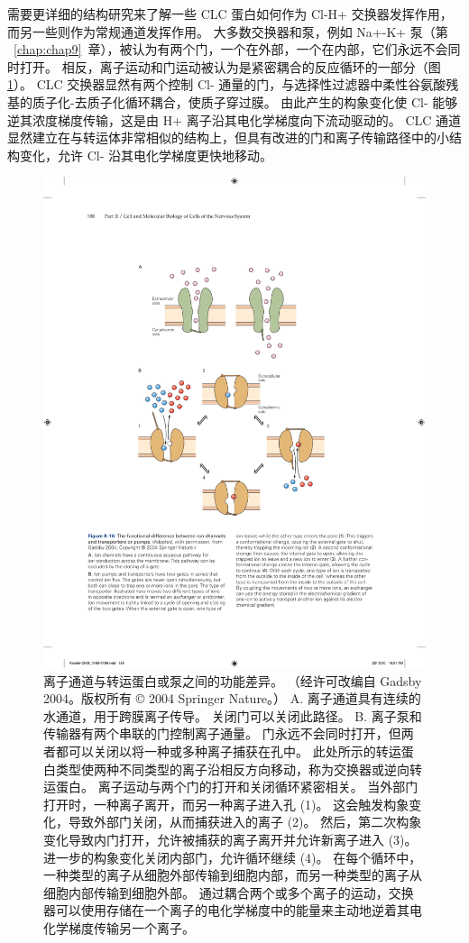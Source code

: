 需要更详细的结构研究来了解一些 CLC 蛋白如何作为 Cl-H+ 交换器发挥作用，而另一些则作为常规通道发挥作用。
大多数交换器和泵，例如 Na+-K+ 泵（第 ~\ref{chap:chap9}~章），被认为有两个门，一个在外部，一个在内部，它们永远不会同时打开。
相反，离子运动和门运动被认为是紧密耦合的反应循环的一部分（图\ref{fig:8_16}）。
CLC 交换器显然有两个控制 Cl- 通量的门，与选择性过滤器中柔性谷氨酸残基的质子化-去质子化循环耦合，使质子穿过膜。
由此产生的构象变化使 Cl- 能够逆其浓度梯度传输，这是由 H+ 离子沿其电化学梯度向下流动驱动的。
CLC 通道显然建立在与转运体非常相似的结构上，但具有改进的门和离子传输路径中的小结构变化，允许 Cl- 沿其电化学梯度更快地移动。


\begin{figure}[htbp]
	\centering
	\includegraphics[width=0.6\linewidth]{chap08/fig_8_16}
	\caption{离子通道与转运蛋白或泵之间的功能差异。 （经许可改编自 Gadsby 2004。版权所有 © 2004 Springer Nature。） A. 离子通道具有连续的水通道，用于跨膜离子传导。 关闭门可以关闭此路径。 B. 离子泵和传输器有两个串联的门控制离子通量。 门永远不会同时打开，但两者都可以关闭以将一种或多种离子捕获在孔中。 此处所示的转运蛋白类型使两种不同类型的离子沿相反方向移动，称为交换器或逆向转运蛋白。 离子运动与两个门的打开和关闭循环紧密相关。 当外部门打开时，一种离子离开，而另一种离子进入孔 (1)。 这会触发构象变化，导致外部门关闭，从而捕获进入的离子 (2)。 然后，第二次构象变化导致内门打开，允许被捕获的离子离开并允许新离子进入 (3)。 进一步的构象变化关闭内部门，允许循环继续 (4)。 在每个循环中，一种类型的离子从细胞外部传输到细胞内部，而另一种类型的离子从细胞内部传输到细胞外部。 通过耦合两个或多个离子的运动，交换器可以使用存储在一个离子的电化学梯度中的能量来主动地逆着其电化学梯度传输另一个离子。}
	\label{fig:8_16}
\end{figure}



